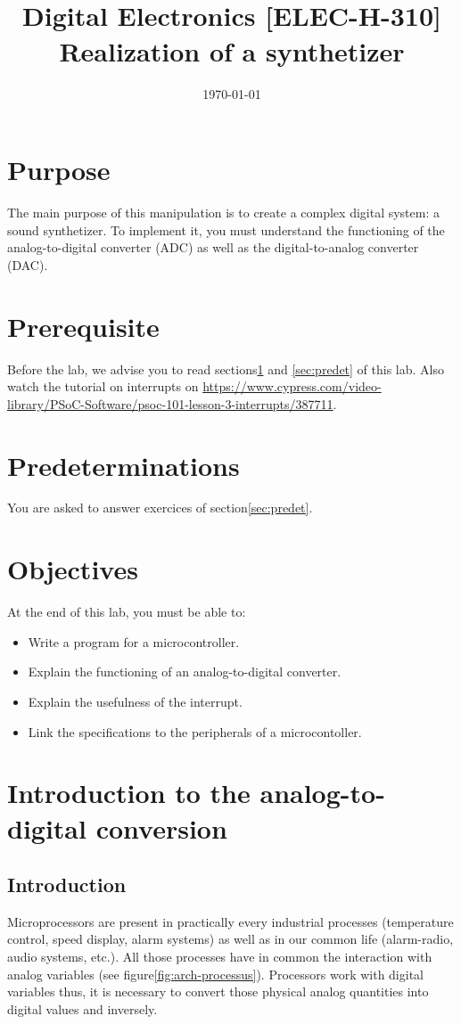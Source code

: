 \documentclass[11pt,a4paper]{article}
\date{\vspace{-1.7cm}\mydate\today}
\title{\vspace{-2cm} \labonumber\\ Digital Electronics [ELEC-H-310]\\Realization of a synthetizer\ifthenelse{\boolean{corrige}}{\\Solution}{}}
\theoremstyle{definition}%
\begin{document}
\pagestyle{empty}
\maketitle
\section*{Purpose}
The main purpose of this manipulation is to create a complex digital system: a sound synthetizer.
To implement it, you must understand the functioning of the analog-to-digital converter (ADC) as well as the digital-to-analog converter (DAC).

\section*{Prerequisite}
Before the lab, we advise you to read sections\ref{sec:intro} and \ref{sec:predet} of this lab. Also watch the tutorial on interrupts on \url{https://www.cypress.com/video-library/PSoC-Software/psoc-101-lesson-3-interrupts/387711}. 

\section*{Predeterminations}
You are asked to answer exercices of section\ref{sec:predet}.

\section*{Objectives}
At the end of this lab, you must be able to:
\begin{itemize}
	\item Write a program for a microcontroller.
	\item Explain the functioning of an analog-to-digital converter.
	\item Explain the usefulness of the interrupt.
	\item Link the specifications to the peripherals of a microcontoller.
\end{itemize}

\newpage{}

\section{Introduction to the analog-to-digital conversion}
\label{sec:intro}

\subsection{Introduction}
Microprocessors are present in practically every industrial processes (temperature control, speed display, alarm systems) as well as in our common life (alarm-radio, audio systems, etc.).
All those processes have in common the interaction with analog variables (see figure\ref{fig:arch-processus}).
Processors work with digital variables thus, it is necessary to convert those physical analog quantities into digital values and inversely.
\end{document}
